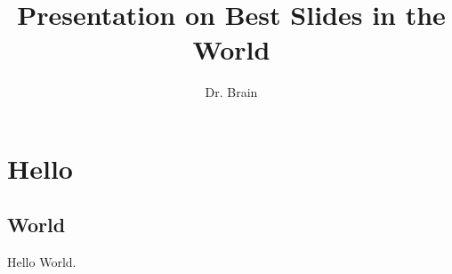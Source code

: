 \documentclass[aspectratio=169]{beamer}
\title[Best Slides in the World]{Presentation on Best Slides in the World}
\institute{Thugonomics}
\author{Dr. Brain}
\begin{document}
\begin{frame}[plain]
    \titlepage
\end{frame}

\section{Hello}
\subsection{World}
\begin{frame}{\secname}{\subsecname}
    Hello World.
\end{frame}
\end{document}
